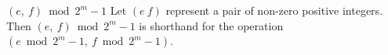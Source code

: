 \begin{definition}{ $(e,~f) \bmod 2^m-1$ \newline}
Let $(e~f)$ represent a pair of non-zero positive integers. Then $(e,~f) \bmod 2^m-1$ is shorthand for the operation $(e \bmod 2^m-1,~f \bmod 2^m-1)$.
\end{definition}








